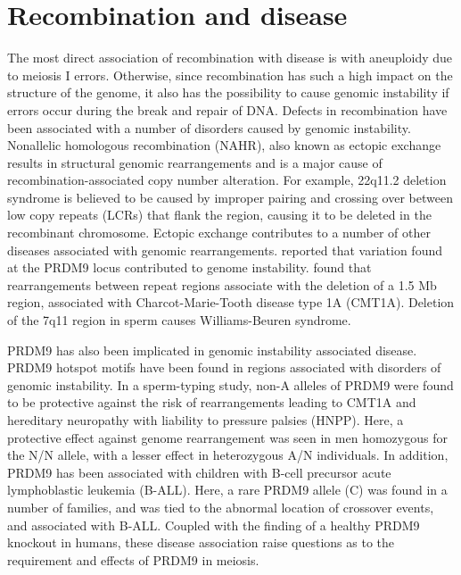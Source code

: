 \section{Recombination and disease}

The most direct association of recombination with disease is with aneuploidy due to meiosis I errors\cite{Hassold2001,Hassold2007}.
Otherwise, since recombination has such a high impact on the structure of the genome, it also has the possibility to cause genomic instability if errors occur during the break and repair of DNA.
Defects in recombination have been associated with a number of disorders caused by genomic instability.
Nonallelic homologous recombination (NAHR), also known as ectopic exchange results in structural genomic rearrangements and is a major cause of recombination-associated copy number alteration.
For example, 22q11.2 deletion syndrome is believed to be caused by improper pairing and crossing over between low copy repeats (LCRs) that flank the region, causing it to be deleted in the recombinant chromosome\cite{Emanuel2008}.
Ectopic exchange contributes to a number of other diseases associated with genomic rearrangements\cite{Stankiewicz2002,Liu2012}.
\citet{Berg2010} reported that variation found at the PRDM9 locus contributed to genome instability.
\citet{Pentao1992} found that rearrangements between repeat regions associate with the deletion of a 1.5 Mb region, associated with Charcot-Marie-Tooth disease type 1A (CMT1A).
Deletion of the 7q11 region in sperm causes Williams-Beuren syndrome\cite{Turner2008}.

PRDM9 has also been implicated in genomic instability associated disease.
PRDM9 hotspot motifs have been found in regions associated with disorders of genomic instability\cite{Myers2008}.
In a sperm-typing study, non-A alleles of PRDM9 were found to be protective against the risk of rearrangements leading to CMT1A and hereditary neuropathy with liability to pressure palsies (HNPP)\cite{Berg2010}.
Here, a protective effect against genome rearrangement was seen in men homozygous for the N/N allele, with a lesser effect in heterozygous A/N individuals.
In addition, PRDM9 has been associated with children with B-cell precursor acute lymphoblastic leukemia (B-ALL)\cite{Hussin2013}.
Here, a rare PRDM9 allele (C) was found in a number of families, and was tied to the abnormal location of crossover events, and associated with B-ALL.
Coupled with the finding of a healthy PRDM9 knockout in humans\cite{Narasimhan2016}, these disease association raise questions as to the requirement and effects of PRDM9 in meiosis.

